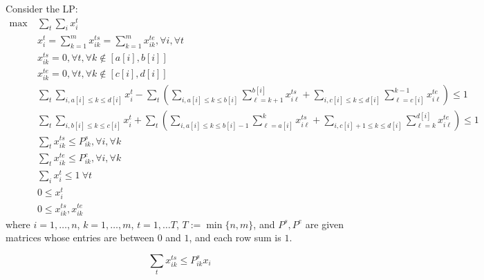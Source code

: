 \documentclass{article}
\begin{document}
Consider the LP:
\begin{align*}
    \max~&\sum_t \sum_i x_{i}^{t}\\
    &x_i^t =\sum_{k=1}^{m}x_{ik}^{ts}=\sum_{k=1}^{m}x_{ik}^{te}, \forall i,\forall t\\
    &x_{ik}^{ts}=0,\forall t,\forall k\notin [a[i],b[i]]\\
    &x_{ik}^{te}=0,\forall t,\forall k\notin [c[i],d[i]]\\
    &\sum_{t}\sum_{i, a[i]\leq k\leq d[i]} x_i^t-\sum_t \left(\sum_{i,a[i]\leq k\leq b[i]}\sum_{\ell = k+1}^{b[i]}x_{i\ell}^{ts}+\sum_{i,c[i]\leq k\leq d[i]}\sum_{\ell =c[i]}^{k-1}x_{i\ell}^{te}\right)\leq 1\\
        &\sum_{t}\sum_{i, b[i]\leq k\leq c[i]} x_i^t+\sum_t \left(\sum_{i,a[i]\leq k\leq b[i]-1}\sum_{\ell = a[i]}^{k}x_{i\ell}^{ts}+\sum_{i,c[i]+1\leq k\leq d[i]}\sum_{\ell =k}^{d[i]}x_{i\ell}^{te}\right)\leq 1\\
    &\sum_{t}x_{ik}^{ts}\leq P_{ik}^{s},\forall i,\forall k\\
    &\sum_{t}x_{ik}^{te}\leq P_{ik}^{e},\forall i,\forall k\\
    &\sum_{i}x_i^t\leq 1~\forall t\\
    &0\leq x_{i}^{t}\\
    &0\leq x_{ik}^{ts},x_{ik}^{te}
\end{align*}
where $i = 1,\ldots, n$, $k = 1,\ldots,m$, $t = 1,\ldots T$, $T:=\min\{n,m\}$, and $P^{s},P^{e}$ are given matrices whose entries are between $0$ and $1$, and each row sum is $1$.
\newpage

\[\sum_{t}x_{ik}^{ts}\leq P_{ik}^{s}x_i\]




\end{document}
